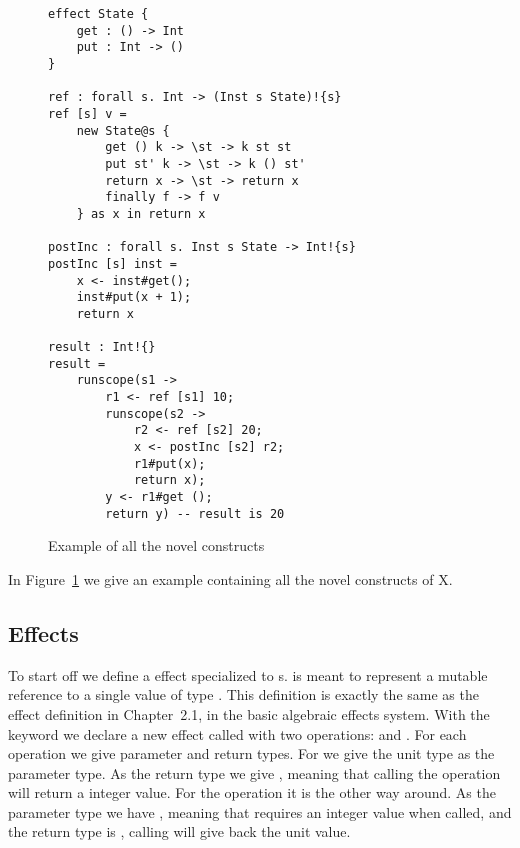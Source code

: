 \begin{figure}
\caption{Example of all the novel constructs}
\begin{verbatim}
effect State {
	get : () -> Int
	put : Int -> ()
}

ref : forall s. Int -> (Inst s State)!{s}
ref [s] v =
	new State@s {
		get () k -> \st -> k st st
		put st' k -> \st -> k () st'
		return x -> \st -> return x
		finally f -> f v
	} as x in return x

postInc : forall s. Inst s State -> Int!{s}
postInc [s] inst =
	x <- inst#get();
	inst#put(x + 1);
	return x

result : Int!{}
result =
	runscope(s1 ->
		r1 <- ref [s1] 10;
		runscope(s2 ->
			r2 <- ref [s2] 20;
			x <- postInc [s2] r2;
			r1#put(x);
			return x);
		y <- r1#get ();
		return y) -- result is 20
\end{verbatim}
\label{fig:example1}
\end{figure}

In Figure~\ref{fig:example1} we give an example containing all the novel constructs of X.

\subsection{Effects}

To start off we define a  effect specialized to s.
 is meant to represent a mutable reference to a single value of type .
This definition is exactly the same as the  effect definition in Chapter~2.1, in the basic algebraic effects system.
With the  keyword we declare a new effect called  with two operations:  and .
For each operation we give parameter and return types. For  we give the unit type \ident{()} as the parameter type.
As the return type we give , meaning that calling the  operation will return a integer value.
For the  operation it is the other way around.
As the parameter type we have , meaning that  requires an integer value when called, and the return type is \ident{()}, calling  will give back the unit value.

